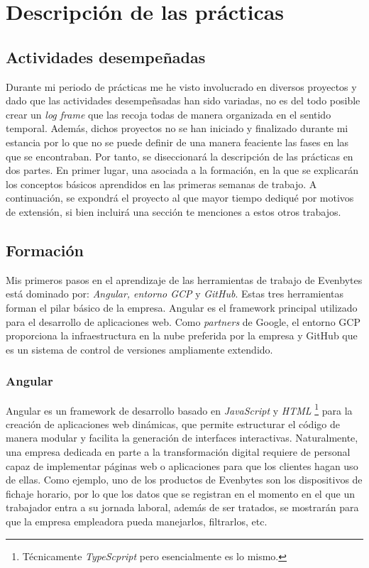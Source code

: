 \chapter{Descripción de las prácticas} \label{descripcion de las practicas}
%
%
\section{Actividades desempeñadas} \label{Actividades desempeñadas}
%
Durante mi periodo de prácticas me he visto involucrado en diversos proyectos y dado que las actividades desempeñsadas han sido variadas, no es del todo posible crear un \textit{log frame} que las recoja todas de manera organizada en el sentido temporal. Además, dichos proyectos no se han iniciado y finalizado durante mi estancia por lo que no se puede definir de una manera feaciente las fases en las que se encontraban. Por tanto, se diseccionará la descripción de las prácticas en dos partes. En primer lugar, una asociada a la formación, en la que se explicarán los conceptos básicos aprendidos en las primeras semanas de trabajo. A continuación, se expondrá el proyecto al que mayor tiempo dediqué por motivos de extensión, si bien incluirá una sección te menciones a estos otros trabajos.
%
%
\section{Formación}
%
%
Mis primeros pasos en el aprendizaje de las herramientas de trabajo de Evenbytes está dominado por: \textit{Angular, entorno GCP} y \textit{GitHub}. Estas tres herramientas forman el pilar básico de la empresa. Angular es el framework principal utilizado para el desarrollo de aplicaciones web. Como \textit{partners} de Google, el entorno GCP proporciona la infraestructura en la nube preferida por la empresa y GitHub que es un sistema de control de versiones ampliamente extendido.
%
%
\subsection{Angular}
%
%
Angular es un framework de desarrollo basado en \textit{JavaScript} y \textit{HTML} \footnote{Técnicamente \textit{TypeScpript} pero esencialmente es lo mismo.} para la creación de aplicaciones web dinámicas, que permite estructurar el código de manera modular y facilita la generación de interfaces interactivas. Naturalmente, una empresa dedicada en parte a la transformación digital requiere de personal capaz de implementar páginas web o aplicaciones para que los clientes hagan uso de ellas. Como ejemplo, uno de los productos de Evenbytes son los dispositivos de fichaje horario, por lo que los datos que se registran en el momento en el que un trabajador entra a su jornada laboral, además de ser tratados, se mostrarán para que la empresa empleadora pueda manejarlos, filtrarlos, etc.\\

